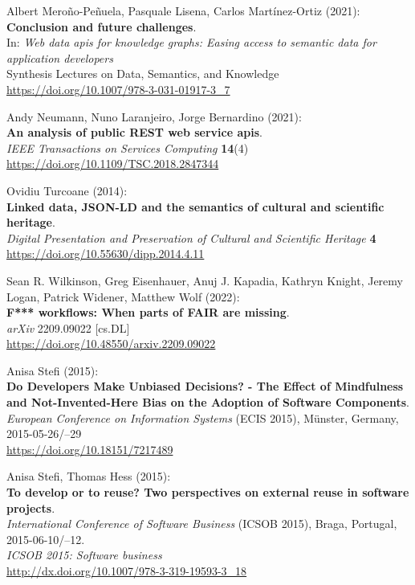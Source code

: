 \begin{thebibliography}{9}
Albert Meroño-Peñuela, Pasquale Lisena, Carlos Martínez-Ortiz (2021):
\textbf{Conclusion and future challenges}. \\
In: \emph{Web data apis for knowledge graphs: {Easing} access to semantic data for application
developers} \\
Synthesis Lectures on Data, Semantics, and Knowledge\\
\url{https://doi.org/10.1007/978-3-031-01917-3_7}

Andy Neumann, Nuno Laranjeiro, Jorge Bernardino (2021): \\
\textbf{An analysis of public {REST} web service apis}.\\
\emph{IEEE Transactions on Services Computing} \textbf{14}(4)\\
\url{https://doi.org/10.1109/TSC.2018.2847344}

Ovidiu Turcoane (2014): \\
\textbf{Linked data, {JSON-LD} and the semantics of cultural and scientific heritage}. \\
\emph{Digital Presentation and Preservation of Cultural and Scientific Heritage} \textbf{4} \\
\url{https://doi.org/10.55630/dipp.2014.4.11}

Sean R. Wilkinson, Greg Eisenhauer, Anuj J. Kapadia, Kathryn Knight,
Jeremy Logan, Patrick Widener, Matthew Wolf (2022): \\
\textbf{F*** workflows: When parts of {FAIR} are missing}. \\
\emph{arXiv} 2209.09022 [cs.DL] \\
\url{https://doi.org/10.48550/arxiv.2209.09022}

Anisa Stefi (2015): \\
\textbf{Do Developers Make Unbiased Decisions? - The Effect of Mindfulness and Not-Invented-Here Bias on the Adoption of Software Components}. \\
\emph{European Conference on Information Systems} (ECIS 2015), Münster, Germany, 2015-05-26/--29 \\
\url{https://doi.org/10.18151/7217489}

Anisa Stefi, Thomas Hess (2015): \\
\textbf{To develop or to reuse? Two perspectives on external reuse in software projects}. \\
\emph{International Conference of Software Business} (ICSOB 2015), Braga, Portugal, 2015-06-10/--12.\\
\emph{ICSOB 2015: Software business} \\
\url{http://dx.doi.org/10.1007/978-3-319-19593-3_18}


\end{thebibliography}
